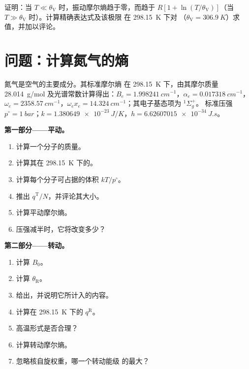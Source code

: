 \begin{exercise}[$\star\star\star$]\label{exo:b3:partition-functions:12}
证明：当 $T \ll \theta_{\mathrm V}$ 时，振动摩尔熵趋于零，而趋于
$R[1 + \ln(T/\theta_{\mathrm V})]$（当 $T \gg \theta_{\mathrm V}$ 时）。计算精确表达式及该极限
在 \qty{298.15}{K} 下对 （$\theta_{\mathrm V} = \qty{306.9}{K}$）求值，并加以评论。
\end{exercise}

\section{问题：计算氮气的熵}

\begin{problem}
\label{pb:b3:partition-functions:1}
氮气是空气的主要成分。其标准摩尔熵
在 \qty{298.15}{K} 下，由其摩尔质量 \qty{28.014}{g/mol}
及光谱常数计算得出：$B_e = \qty{1.998241}{cm^{-1}}$，$\alpha_e = \qty{0.017318}{cm^{-1}}$，$\omega_e =
\qty{2358.57}{cm^{-1}}$，$\omega_ex_e = \qty{14.324}{cm^{-1}}$；其电子基态项为 ${}^1\Sigma_g^+$。
标准压强 $p^\circ = \qty{1}{bar}$；$k = \qty{1.380649e-23}{J/K}$，$h = \qty{6.62607015e-34}{J.s}$。

\medskip\noindent\textbf{第一部分——平动。}
\begin{enumerate}
  \item 计算一个分子的质量。
  \item 计算其在 \qty{298.15}{K} 下的。
  \item 计算每个分子可占据的体积 $kT/p^\circ$。
  \item 推出 $q^{\mathrm T}/N$，并评论其大小。
  \item 计算平动摩尔熵。
  \item 压强减半时，它将改变多少？
\end{enumerate}

\medskip\noindent\textbf{第二部分——转动。}
\begin{enumerate}[resume]
  \item 计算 $B_0$。
  \item 计算 $\theta_{\mathrm R}$。
  \item 给出，并说明它所计入的内容。
  \item 计算在 \qty{298.15}{K} 下的 $q^{\mathrm R}$。
  \item 高温形式是否合理？
  \item 计算转动摩尔熵。
  \item 忽略核自旋权重，哪一个转动能级
        的最大？
\end{enumerate}


\end{problem}
